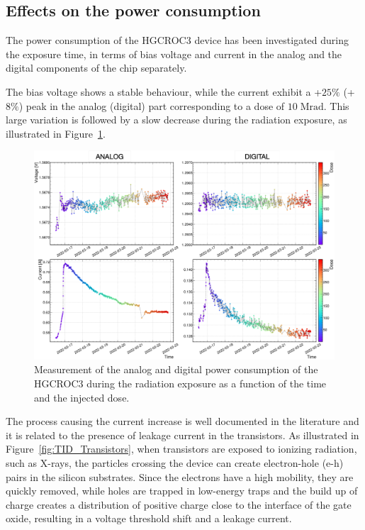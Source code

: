 \subsection{Effects on the power consumption}
\label{subsec:Power consumption}

The power consumption of the HGCROC3 device has been investigated during the exposure time, in terms of bias voltage and current in the analog and the digital components of the chip separately.

The bias voltage shows a stable behaviour, while the current exhibit a +$25\%$ (+$8\%$) peak in the analog (digital) part corresponding to a dose of $10\;\textrm{Mrad}$. This large variation is followed by a slow decrease during the radiation exposure, as illustrated in Figure~\ref{fig:TID_Power}.

\begin{figure}
    \centering
    \includegraphics[width=0.99\linewidth]{Figures/HGCAL/TID_Power.pdf}
    \caption{Measurement of the analog and digital power consumption of the HGCROC3 during the radiation exposure as a function of the time and the injected dose.}
    \label{fig:TID_Power}
\end{figure}

\bigbreak

The process causing the current increase is well documented in the literature and it is related to the presence of leakage current in the transistors. 
As illustrated in Figure~\ref{fig:TID_Transistors}, when transistors are exposed to ionizing radiation, such as X-rays, the particles crossing the device can create electron-hole (e-h) pairs in the silicon substrates. Since the electrons have a high mobility, they are quickly removed, while holes are trapped in low-energy traps and the build up of charge creates a distribution of positive charge close to the interface of the gate oxide, resulting in a voltage threshold shift and a leakage current. 

